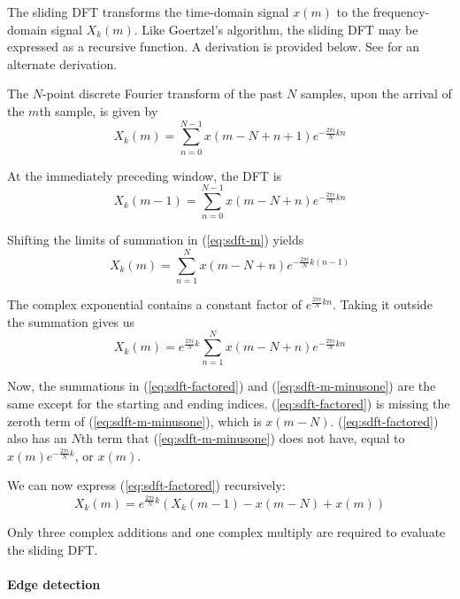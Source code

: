 \documentclass[10pt]{article}
\begin{document}
The sliding DFT transforms the time-domain signal \(x(m)\) to the frequency-domain signal \(X_k(m)\).  Like Goertzel's algorithm, the sliding DFT may be expressed as a recursive function.  A derivation is provided below.  See \cite{sliding-dft-ieee} for an alternate derivation.

The \(N\)-point discrete Fourier transform of the past \(N\) samples, upon the arrival of the \(m\)th sample, is given by
\begin{equation}
\label{eq:sdft-m}
X_k(m) = \sum_{n=0}^{N-1} {x(m-N+n+1) e^{- \frac{2 \pi i}{N} kn}}
\end{equation}

At the immediately preceding window, the DFT is
\begin{equation}
\label{eq:sdft-m-minusone}
X_k(m-1) = \sum_{n=0}^{N-1} {x(m-N+n) e^{- \frac{2 \pi i}{N} kn}}
\end{equation}

Shifting the limits of summation in (\ref{eq:sdft-m}) yields
\[
X_k(m) = \sum_{n=1}^{N} {x(m-N+n) e^{- \frac{2 \pi i}{N} k(n-1)}}
\]

The complex exponential contains a constant factor of \(e^{\frac{2 \pi i}{N} kn}\).  Taking it outside the summation gives us
\begin{equation}
\label{eq:sdft-factored}
X_k(m) = e^{\frac{2 \pi i}{N} k} \sum_{n=1}^{N} {x(m-N+n) e^{- \frac{2 \pi i}{N} kn}}
\end{equation}

Now, the summations in (\ref{eq:sdft-factored}) and (\ref{eq:sdft-m-minusone}) are the same except for the starting and ending indices.  (\ref{eq:sdft-factored}) is missing the zeroth term of (\ref{eq:sdft-m-minusone}), which is \(x(m-N)\).  (\ref{eq:sdft-factored}) also has an \(N\)th term that (\ref{eq:sdft-m-minusone}) does not have, equal to \(x(m) e^{- \frac{2 \pi i}{N} k}\), or \(x(m)\).

We can now express (\ref{eq:sdft-factored}) recursively:
\begin{equation}
X_k(m) = e^{\frac{2 \pi i}{N} k} (X_k(m-1) - x(m-N) + x(m))
\end{equation}

Only three complex additions and one complex multiply are required to evaluate the sliding DFT.

\paragraph{Edge detection}
\end{document}
